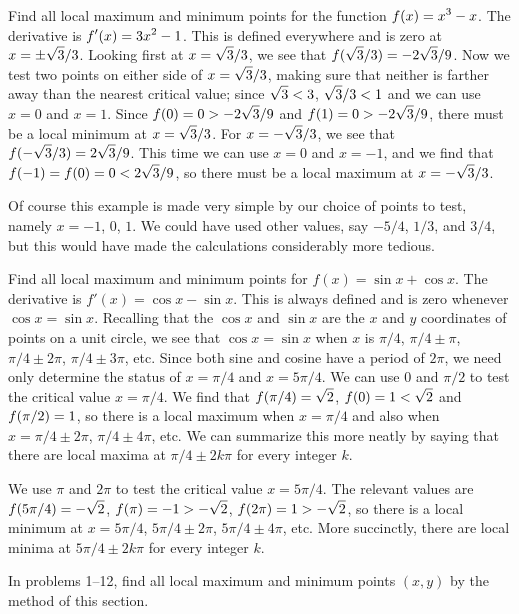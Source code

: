 \example
Find all local maximum and minimum points for the function 
$\displaystyle f(x)=x^3-x$. The derivative is $\displaystyle f'(x)=3x^2-1$. This is defined
everywhere and is zero at $\displaystyle x=\pm \sqrt{3}/3$. Looking first at
$\displaystyle x=\sqrt{3}/3$, we see that $\displaystyle f(\sqrt{3}/3)=-2\sqrt{3}/9$. Now we test
two points on either side of 
$\displaystyle x=\sqrt{3}/3$, making sure that neither is farther away than
the nearest critical value; since $\displaystyle \sqrt{3}<3$, $\displaystyle \sqrt{3}/3<1$ and
we can use $x=0$ and $x=1$. Since
$\displaystyle f(0)=0>-2\sqrt{3}/9$
and $\displaystyle f(1)=0>-2\sqrt{3}/9$, there must be a local minimum at 
$\displaystyle x=\sqrt{3}/3$. For $\displaystyle x=-\sqrt{3}/3$, we see that
$\displaystyle f(-\sqrt{3}/3)=2\sqrt{3}/9$. This time we can use $x=0$ and $x=-1$,
and we find that $\displaystyle f(-1)=f(0)=0< 2\sqrt{3}/9$, so there must be a local
maximum at $\displaystyle x=-\sqrt{3}/3$.
\endexample

Of course this example is made very simple by our choice of points to
test, namely $x=-1$, $0$, $1$. We could have used other values, say
$-5/4$, $1/3$, and $3/4$, but this would have made the calculations
considerably more tedious.

\example\relax
{}
Find all local maximum and minimum points for 
$f(x)=\sin x+\cos x$. The derivative is $f'(x)=\cos x-\sin x$. This is
always defined and is zero whenever $\cos x=\sin x$. Recalling that
the $\cos x$ and $\sin x$ are the $x$ and $y$ coordinates of points on
a unit circle, we see that $\cos x=\sin x$ when $x$ is $\pi/4$, 
$\pi/4\pm\pi$, $\pi/4\pm2\pi$, $\pi/4\pm3\pi$, etc. Since both sine
and cosine have a period of $2\pi$, we need only determine the status
of $x=\pi/4$ and $x=5\pi/4$. We can use $0$ and $\pi/2$ to test the
critical value $x= \pi/4$. 
We find that $\displaystyle f(\pi/4)=\sqrt{2}$, $\displaystyle f(0)=1<\sqrt{2}$ and $\displaystyle f(\pi/2)=1$,
so there is a local maximum when $x=\pi/4$ and also when
$x=\pi/4\pm2\pi$, $\pi/4\pm4\pi$, etc. We can summarize this more
neatly by saying that there are local maxima at $\pi/4\pm 2k\pi$ for
every integer $k$.

We use $\pi$ and $2\pi$ to test the critical value $x=5\pi/4$. The
relevant values are $\displaystyle f(5\pi/4)=-\sqrt2$, $\displaystyle f(\pi)=-1>-\sqrt2$,
$\displaystyle f(2\pi)=1>-\sqrt2$, so there is a local minimum at $x=5\pi/4$,
$5\pi/4\pm2\pi$, $5\pi/4\pm4\pi$, etc. More succinctly, there are
local minima at $5\pi/4\pm 2k\pi$ for
every integer $k$.
\endexample

\exercises In problems 1--12, find all local maximum and minimum
points $(x,y)$ by the method of this section.

